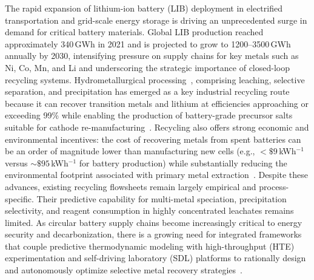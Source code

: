 \documentclass[final,2p,times]{elsarticle}
\begin{document}
The rapid expansion of lithium-ion battery (LIB) deployment in electrified transportation and grid-scale energy storage is driving an unprecedented surge in demand for critical battery materials. Global LIB production reached approximately 340\,GWh in 2021 and is projected to grow to 1200--3500\,GWh annually by 2030, intensifying pressure on supply chains for key metals such as Ni, Co, Mn, and Li and underscoring the strategic importance of closed-loop recycling systems. Hydrometallurgical processing~\cite{harper_recycling_2019,free_hydrometallurgy_2021,kwon_fundamental_2020}, comprising leaching, selective separation, and precipitation has emerged as a key industrial recycling route because it can recover transition metals and lithium at efficiencies approaching or exceeding 99\% while enabling the production of battery-grade precursor salts suitable for cathode re-manufacturing~\cite{mohr_toward_2020,thompson_importance_2021,georgi-maschler_development_2012}. Recycling also offers strong economic and environmental incentives: the cost of recovering metals from spent batteries can be an order of magnitude lower than manufacturing new cells (e.g., $<\$9$\,kWh$^{-1}$ versus $\sim\$95$\,kWh$^{-1}$ for battery production) while substantially reducing the environmental footprint associated with primary metal extraction~\cite{ciez_examining_2019,peters_environmental_2017}. Despite these advances, existing recycling flowsheets remain largely empirical and process-specific. Their predictive capability for multi-metal speciation, precipitation selectivity, and reagent consumption in highly concentrated leachates remains limited. As circular battery supply chains become increasingly critical to energy security and decarbonization, there is a growing need for integrated frameworks that couple predictive thermodynamic modeling with high-throughput (HTE) experimentation and self-driving laboratory (SDL) platforms to rationally design and autonomously optimize selective metal recovery strategies~\cite{parkhurst_description_2013,rinne_metal_2021,abolhasani_rise_2023}.
\end{document}
